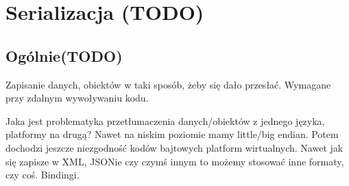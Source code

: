 %
%
%
%
%
%

\section{Serializacja (TODO)}
\subsection{Ogólnie(TODO)}
Zapisanie danych, obiektów w taki sposób, żeby się dało przesłać. Wymagane przy zdalnym wywoływaniu kodu.

Jaka jest problematyka przetłumaczenia danych/obiektów z jednego języka, platformy na drugą?
Nawet na niskim poziomie mamy little/big endian. Potem dochodzi jeszcze niezgodność kodów bajtowych platform wirtualnych.
Nawet jak się zapisze w XML, JSONie czy czymś innym to możemy stosować inne formaty, czy coś. Bindingi.

